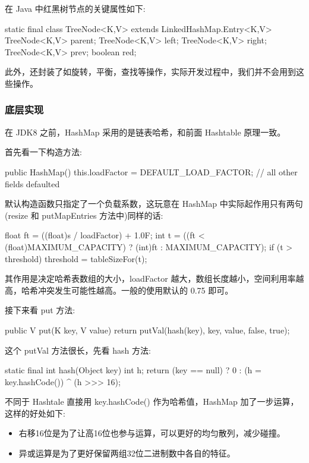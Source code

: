 在 Java 中红黑树节点的关键属性如下:

\begin{Java}
static final class TreeNode<K,V> extends LinkedHashMap.Entry<K,V> {
    TreeNode<K,V> parent;
    TreeNode<K,V> left;
    TreeNode<K,V> right;
    TreeNode<K,V> prev;
    boolean red;
}
\end{Java}

此外，还封装了如旋转，平衡，查找等操作，实际开发过程中，我们并不会用到这些操作。

\subsubsection{底层实现}

在 JDK8 之前，HashMap 采用的是链表哈希，和前面 Hashtable 原理一致。

首先看一下构造方法:

\begin{Java}
public HashMap() {
    this.loadFactor = DEFAULT_LOAD_FACTOR; // all other fields defaulted
}
\end{Java}

默认构造函数只指定了一个负载系数，这玩意在 HashMap 中实际起作用只有两句(resize 和 putMapEntries 方法中)同样的话:

\begin{Java}
float ft = ((float)s / loadFactor) + 1.0F;
int t = ((ft < (float)MAXIMUM_CAPACITY) ? (int)ft : MAXIMUM_CAPACITY);
if (t > threshold) threshold = tableSizeFor(t);
\end{Java}

其作用是决定哈希表数组的大小，loadFactor 越大，数组长度越小，空间利用率越高，哈希冲突发生可能性越高。一般的使用默认的 0.75 即可。

接下来看 put 方法:

\begin{Java}
public V put(K key, V value) {
    return putVal(hash(key), key, value, false, true);
}
\end{Java}

这个 putVal 方法很长，先看 hash 方法:

\begin{Java}
static final int hash(Object key) {
    int h;
    return (key == null) ? 0 : (h = key.hashCode()) ^ (h >>> 16);
}
\end{Java}

不同于 Hashtale 直接用 key.hashCode() 作为哈希值，HashMap 加了一步运算，这样的好处如下:
\begin{itemize}
    \item 右移16位是为了让高16位也参与运算，可以更好的均匀散列，减少碰撞。
    \item 异或运算是为了更好保留两组32位二进制数中各自的特征。
\end{itemize}

